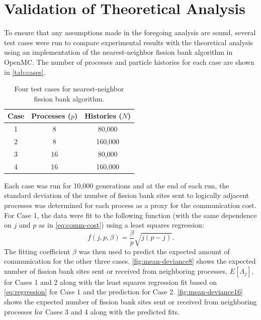 \section{Validation of Theoretical Analysis}
\label{sec:fission-bank-validation}

To ensure that any assumptions made in the foregoing analysis are sound, several
test cases were run to compare experimental results with the theoretical
analysis using an implementation of the nearest-neighbor fission bank algorithm
in OpenMC. The number of processes and particle histories for each case are
shown in \autoref{tab:cases}.
\begin{table}[ht!]
  \centering
  \caption{Four test cases for nearest-neighbor fission bank algorithm.}
  \label{tab:cases}
  \begin{tabular}{ c c c }
    \toprule
    Case & Processes ($p$) & Histories ($N$) \\ 
    \midrule
    1 & 8 & 80,000 \\
    2 & 8 & 160,000 \\
    3 & 16 & 80,000 \\
    4 & 16 & 160,000 \\
    \bottomrule
  \end{tabular}
\end{table}
Each case was run for 10,000 generations and at the end of each run, the
standard deviation of the number of fission bank sites sent to logically
adjacent processes was determined for each process as a proxy for the
communication cost. For Case 1, the data were fit to the following function
(with the same dependence on $j$ and $p$ as in \eqref{eq:comm-cost}) using a
least squares regression:
\begin{equation}
  \label{eq:regression}
  f(j,p,\beta) = \frac{\beta}{p} \sqrt{j(p-j)}.
\end{equation}
The fitting coefficient $\beta$ was then used to predict the expected amount of
communication for the other three cases. \autoref{fig:mean-deviance8} shows the
expected number of fission bank sites sent or received from neighboring
processes, $E \left [ \Lambda_j \right ]$, for Cases 1 and 2 along with the
least squares regression fit based on \eqref{eq:regression} for Case 1 and the
prediction for Case 2. \autoref{fig:mean-deviance16} shows the expected number
of fission bank sites sent or received from neighboring processes for Cases 3
and 4 along with the predicted fits.
